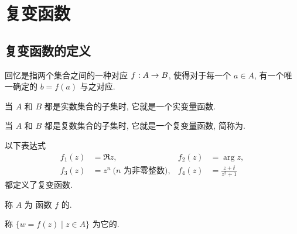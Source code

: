 \section{复变函数}

\subsection{复变函数的定义}

回忆是指两个集合之间的一种对应 $f:A\rightarrow B$, 使得对于每一个 $a\in A$, 有一个唯一确定的 $b=f(a)$ 与之对应.
\begin{enuma}
  \item 当 $A$ 和 $B$ 都是实数集合的子集时, 它就是一个实变量函数.
  \item 当 $A$ 和 $B$ 都是复数集合的子集时, 它就是一个复变量函数, 简称为.
\end{enuma}

\begin{example}
  \label{exam:complex-functions}
  以下表达式
  \begin{align*}
    f_1(z)&=\Re z,&
    f_2(z)&=\arg z,\\
    f_3(z)&=z^n \ \text{($n$ 为非零整数)},&
    f_4(z)&=\frac{z+\ii}{z^2+1}
  \end{align*}
  都定义了复变函数.
\end{example}

\begin{definition}
  \begin{enuma}
    \item 称 $A$ 为 函数 $f$ 的.
    \item 称 $\{w=f(z)\mid z\in A\}$ 为它的.\footnotemark
  \end{enuma} 
\end{definition}


